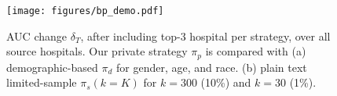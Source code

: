 \begin{figure}[t]
    \begin{minipage}{0.42\textwidth}
        \subcaption{\label{left}  }
        \label{fig:demo_strats}
    \end{minipage}
    \begin{minipage}{0.42\textwidth}
        \subcaption{\label{right} }
     \label{fig:p_strats}
    \end{minipage}
  \centering
  \texttt{[image: figures/bp\_demo.pdf]}
  \caption{AUC change $\delta_T$, after including top-$3$ hospital per strategy, over all source hospitals. Our private strategy $\pi_p$ is compared with (a) demographic-based $\pi_d$ for gender, age, and race. (b) plain text limited-sample $\pi_s(k=K)$ for $k=300$ (10\%) and $k=30$ (1\%).}%
\end{figure}




